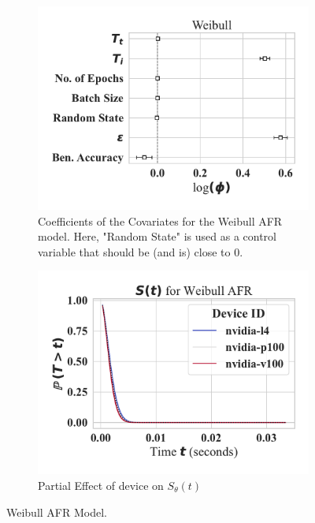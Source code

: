 \documentclass[journal]{IEEEtran}
\begin{document}
\begin{figure}[h!]
    \centering
    \captionsetup[subfigure]{skip=0pt} %
    \begin{subfigure}[b]{\linewidth}
        \centering
        \includegraphics[width=.6\linewidth,clip]{plots/combined/weibull_aft.pdf}
        \caption{Coefficients of the Covariates for the Weibull AFR model. Here, "Random State" is used as a control variable that should be (and is) close to 0.}
        \label{fig:aft}
    \end{subfigure}
    \begin{subfigure}[b]{\linewidth}
        \centering
        \includegraphics[width=.6\linewidth,clip]{plots/combined/weibull_device_num_partial_effect.pdf}
        \caption{Partial Effect  of device on $S_{\theta}(t)$ }
        \label{fig:partial}
    \end{subfigure}
    \caption{Weibull AFR Model.}
\end{figure}
\end{document}

